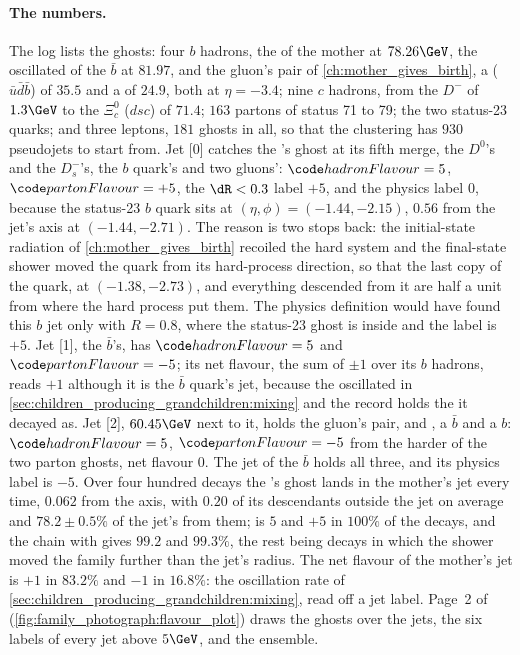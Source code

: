 \paragraph{The numbers.} The log lists the ghosts: four $b$ hadrons, the
\Bbar of the mother at $78.26\GeV$, the oscillated \Bbar of the $\bar b$
at $81.97$, and the gluon's pair of \cref{ch:mother_gives_birth}, a
\Lbbar ($\bar u\bar d\bar b$) of $35.5$ and a \Bbar of $24.9$, both at
$\eta=-3.4$; nine $c$ hadrons, from the $D^-$ of $1.3\GeV$ to the
$\Xi_c^0$ ($dsc$) of $71.4$; $163$ partons of status 71 to 79; the two
status-23 quarks; and three leptons, $181$ ghosts in all, so that the
\akfour clustering has $930$ pseudojets to start from. Jet [0] catches
the \Bbar's ghost at its fifth merge, the $D^0$'s and the $D_s^-$'s, the
$b$ quark's and two gluons': $\hadflav=5$, $\partflav=+5$, the $\dR<0.3$
label $+5$, and the physics label $0$, because the status-23 $b$ quark
sits at $(\eta,\phi)=(-1.44,-2.15)$, $0.56$ from the jet's axis at
$(-1.44,-2.71)$. The reason is two stops back: the initial-state
radiation of \cref{ch:mother_gives_birth} recoiled the hard system and
the final-state shower moved the quark from its hard-process direction,
so that the last copy of the quark, at $(-1.38,-2.73)$, and everything
descended from it are half a unit from where the hard process put them.
The physics definition would have found this $b$ jet only with $R=0.8$,
where the status-23 ghost is inside and the label is $+5$. Jet [1], the
$\bar b$'s, has $\hadflav=5$ and $\partflav=-5$; its net flavour, the
sum of $\pm1$ over its $b$ hadrons, reads $+1$ although it is the $\bar b$
quark's jet, because the \Bz oscillated in
\cref{sec:children_producing_grandchildren:mixing} and the record holds
the \Bbar it decayed as. Jet [2], $60.45\GeV$ next to it, holds the
gluon's pair, \Lbbar and \Bbar, a $\bar b$ and a $b$: $\hadflav=5$,
$\partflav=-5$ from the harder of the two parton ghosts, net flavour
$0$. The \akeight jet of the $\bar b$ holds all three, and its physics
label is $-5$. Over four hundred decays the \Bbar's ghost lands in the
mother's \akfour jet every time, $0.062$ from the axis, with $0.20$ of its
descendants outside the jet on average and $78.2\pm0.5\%$ of the jet's
\pt from them; \hadflav is $5$ and \partflav $+5$ in $100\%$ of the
decays, and the \PYTHIA chain with \FASTJET gives $99.2$ and $99.3\%$, the
rest being decays in which the shower moved the family further than the
jet's radius. The net flavour of the mother's jet is $+1$ in $83.2\%$ and
$-1$ in $16.8\%$: the oscillation rate of
\cref{sec:children_producing_grandchildren:mixing}, read off a jet label.
Page~2 of  (\cref{fig:family_photograph:flavour_plot})
draws the ghosts over the jets, the six labels of every jet above
$5\GeV$, and the ensemble.

